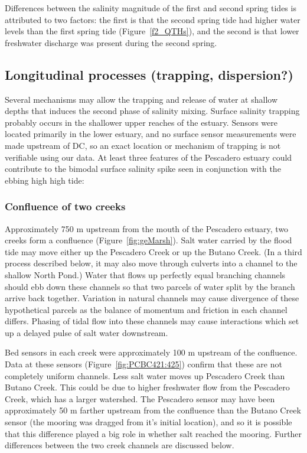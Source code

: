 Differences between the salinity magnitude of the first and second spring tides is attributed to two factors: the first is that the second spring tide had higher water levels than the first spring tide (Figure~\ref{f2_QTHs}), and the second is that lower freshwater discharge was present during the second spring.  

\subsection{Longitudinal processes (trapping, dispersion?)}

Several mechanisms may allow the trapping and release of water at shallow depths that induces the second phase of salinity mixing. Surface salinity trapping probably occurs in the shallower upper reaches of the estuary. Sensors were located primarily in the lower estuary, and no surface sensor measurements were made upstream of DC, so an exact location or mechanism of trapping is not verifiable using our data. At least three features of the Pescadero estuary could contribute to the bimodal surface salinity spike seen in conjunction with the ebbing high high tide:

\subsubsection{Confluence of two creeks}
Approximately 750 m upstream from the mouth of the Pescadero estuary, two creeks form a confluence (Figure~\ref{fig:geMarsh}). Salt water carried by the flood tide may move either up the Pescadero Creek or up the Butano Creek. (In a third process described below, it may also move through culverts into a channel to the shallow North Pond.) Water that flows up perfectly equal branching channels should ebb down these channels so that two parcels of water split by the branch arrive back together. Variation in natural channels may cause divergence of these hypothetical parcels as the balance of momentum and friction in each channel differs. Phasing of tidal flow into these channels may cause interactions which set up a delayed pulse of salt water downstream. 

Bed sensors in each creek were approximately 100 m upstream of the confluence. Data at these sensors (Figure~\ref{fig:PCBC421:425}) confirm that these are not completely uniform channels. Less salt water moves up Pescadero Creek than Butano Creek. This could be due to higher freshwater flow from the Pescadero Creek, which has a larger watershed. The Pescadero sensor may have been approximately 50 m farther upstream from the confluence than the Butano Creek sensor (the mooring was dragged from it's initial location), and so it is possible that this difference played a big role in whether salt reached the mooring. Further differences between the two creek channels are discussed below.

